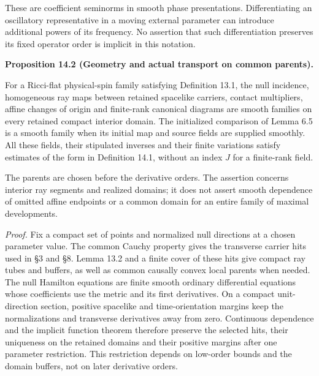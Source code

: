 \documentclass[
  english,
  11pt,
  reqno]{amsart}
\makeatletter
\newcommand{\pandocstatementheading}[1]{%
  \par\if@nobreak\else
    \addpenalty{\@beginparpenalty}%
    \addvspace{.5\baselineskip plus .2\baselineskip minus .2\baselineskip}%
  \fi
  {\normalfont\bfseries #1\par}%
  \nobreak\@afterindenttrue\@afterheading
}
\makeatother
\begin{document}
These are coefficient seminorms in smooth phase presentations.
Differentiating an oscillatory representative in a moving external
parameter can introduce additional powers of its frequency. No assertion
that such differentiation preserves its fixed operator order is implicit
in this notation.

\pandocstatementheading{\protect{}\label{prop:family-geometric-ray-comparisons}Proposition 14.2 (Geometry and actual transport on common parents).}

For a Ricci-flat physical-spin family satisfying Definition 13.1, the
null incidence, homogeneous ray maps between retained spacelike
carriers, contact multipliers, affine changes of origin and finite-rank
canonical diagrams are smooth families on every retained compact
interior domain. The initialized comparison of Lemma 6.5 is a smooth
family when its initial map and source fields are supplied smoothly. All
these fields, their stipulated inverses and their finite variations
satisfy estimates of the form in Definition 14.1, without an index \(J\)
for a finite-rank field.

The parents are chosen before the derivative orders. The assertion
concerns interior ray segments and realized domains; it does not assert
smooth dependence of omitted affine endpoints or a common domain for an
entire family of maximal developments.

\emph{Proof.} Fix a compact set of points and normalized null directions
at a chosen parameter value. The common Cauchy property gives the
transverse carrier hits used in §3 and §8. Lemma 13.2 and a finite cover
of these hits give compact ray tubes and buffers, as well as common
causally convex local parents when needed. The null Hamilton equations
are finite smooth ordinary differential equations whose coefficients use
the metric and its first derivatives. On a compact unit-direction
section, positive spacelike and time-orientation margins keep the
normalizations and transverse derivatives away from zero. Continuous
dependence and the implicit function theorem therefore preserve the
selected hits, their uniqueness on the retained domains and their
positive margins after one parameter restriction. This restriction
depends on low-order bounds and the domain buffers, not on later
derivative orders.
\end{document}
